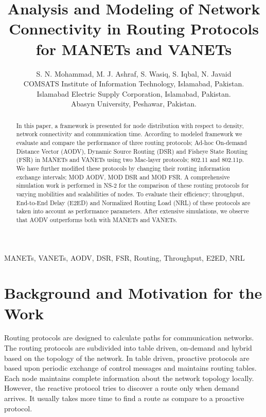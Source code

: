 \documentclass[journal]{IEEEtran}
\begin{document}
\title{Analysis and Modeling of Network Connectivity in Routing Protocols for MANETs and VANETs }

\author{S. N. Mohammad, M. J. Ashraf, S. Wasiq, S. Iqbal, N. Javaid\\\vspace{0.4cm}
        COMSATS Institute of Information Technology, Islamabad, Pakistan.\\
        Islamabad Electric Supply Corporation, Islamabad, Pakistan.\\
        Abasyn University, Peshawar, Pakistan.\\

     }

\maketitle

\begin{abstract}
In this paper, a framework is presented for node distribution with respect to density, network connectivity and communication time. According to modeled framework we evaluate and compare the performance of three routing protocols; Ad-hoc On-demand Distance Vector (AODV), Dynamic Source Routing (DSR) and Fisheye State Routing (FSR) in MANETs and VANETs using two Mac-layer protocols; 802.11 and 802.11p. We have further modified these protocols by changing their routing information exchange intervals; MOD AODV, MOD DSR and MOD FSR. A comprehensive simulation work is performed in NS-2 for the comparison of these routing protocols for varying mobilities and scalabilities of nodes. To evaluate their efficiency; throughput, End-to-End Delay (E2ED) and Normalized Routing Load (NRL) of these protocols are taken into account as performance parameters. After extensive simulations, we observe that AODV outperforms both with MANETs and VANETs.
\end{abstract}

\begin{IEEEkeywords}
MANETs, VANETs, AODV, DSR, FSR, Routing, Throughput, E2ED, NRL
\end{IEEEkeywords}

\IEEEpeerreviewmaketitle


\section{Background and Motivation for the Work}
Routing protocols are designed to calculate paths for communication networks. The routing protocols are subdivided into table driven, on-demand and hybrid based on the topology of the network. In table driven, proactive protocols are based upon periodic exchange of control messages and maintains routing tables. Each node maintains complete information about the network topology locally. However, the reactive protocol tries to discover a route only when demand arrives. It usually takes more time to find a route as compare to a proactive protocol.
\end{document}
